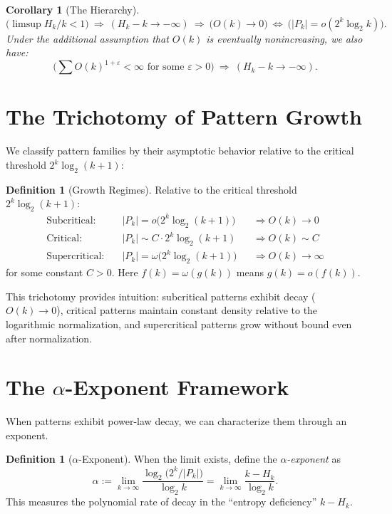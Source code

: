 \documentclass[11pt]{article}
\newtheorem{corollary}[theorem]{Corollary}
\theoremstyle{definition}
\newtheorem{definition}[theorem]{Definition}
\newcommand{\eps}{\varepsilon}
\begin{document}
\begin{corollary}[The Hierarchy]\label{cor:hierarchy}
\begin{equation}\label{eq:lattice}
\big(\limsup H_k/k<1\big)\ \Rightarrow\ (H_k-k\to-\infty)\ \Rightarrow\ \big(O(k)\to 0\big)\ \Leftrightarrow\ \big(|P_k|=o(2^k\log_2 k)\big).
\end{equation}
Under the additional assumption that $O(k)$ is eventually nonincreasing, we also have:
$$\big(\sum O(k)^{1+\eps} < \infty \text{ for some } \eps > 0\big)\ \Rightarrow\ (H_k-k\to-\infty).$$
\end{corollary}

\section{The Trichotomy of Pattern Growth}

We classify pattern families by their asymptotic behavior relative to the critical threshold $2^k\log_2(k+1)$:

\begin{definition}[Growth Regimes]\label{def:regimes}
Relative to the critical threshold $2^k \log_2(k+1)$:
\begin{align*}
\text{Subcritical:}&\quad |P_k|=o\big(2^k\log_2(k+1)\big) &&\Rightarrow O(k)\to 0\\
\text{Critical:}&\quad |P_k|\sim C\cdot 2^k\log_2(k+1) &&\Rightarrow O(k)\sim C\\
\text{Supercritical:}&\quad |P_k|=\omega\big(2^k\log_2(k+1)\big) &&\Rightarrow O(k)\to\infty
\end{align*}
for some constant $C > 0$. Here $f(k) = \omega(g(k))$ means $g(k) = o(f(k))$.
\end{definition}

This trichotomy provides intuition: subcritical patterns exhibit decay ($O(k) \to 0$), critical patterns maintain constant density relative to the logarithmic normalization, and supercritical patterns grow without bound even after normalization.

\section{The $\alpha$-Exponent Framework}

When patterns exhibit power-law decay, we can characterize them through an exponent.

\begin{definition}[$\alpha$-Exponent]\label{def:alpha}
When the limit exists, define the \emph{$\alpha$-exponent} as
\begin{equation}\label{eq:alpha}
\alpha:=\lim_{k\to\infty}\frac{\log_2\big(2^k/|P_k|\big)}{\log_2 k} = \lim_{k\to\infty}\frac{k - H_k}{\log_2 k}.
\end{equation}
This measures the polynomial rate of decay in the ``entropy deficiency'' $k - H_k$.
\end{definition}
\end{document}
